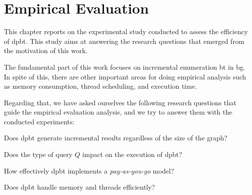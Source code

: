 \chapter{Empirical Evaluation}\label{experiments}
This chapter reports on the experimental study conducted to assess the efficiency of \acrshort{dpbt}. This study aims at answering the research questions that emerged from the motivation of this work. 

The fundamental part of this work focuses on incremental enumeration \acrshort{bt} in \acrshort{bg}. 
In spite of this, there are other important areas for doing empirical analysis such as memory consumption, thread scheduling, and execution time.

Regarding that, we have asked ourselves the following research questions that guide the empirical evaluation analysis, and we try to answer them with the conducted experiments:
\begin{inparaenum}[\bf {\bf RQ}1\upshape)]
\label{res:bt:question}
    \item Does \acrshort{dpbt} generate incremental results regardless of the size of the graph?
    \item Does the type of query $Q$ impact on the execution of \acrshort{dpbt}?
    \item How effectively \acrshort{dpbt} implements a \emph{pay-as-you-go} model?
    \item Does \acrshort{dpbt} handle memory and threads efficiently?
\end{inparaenum}
  
